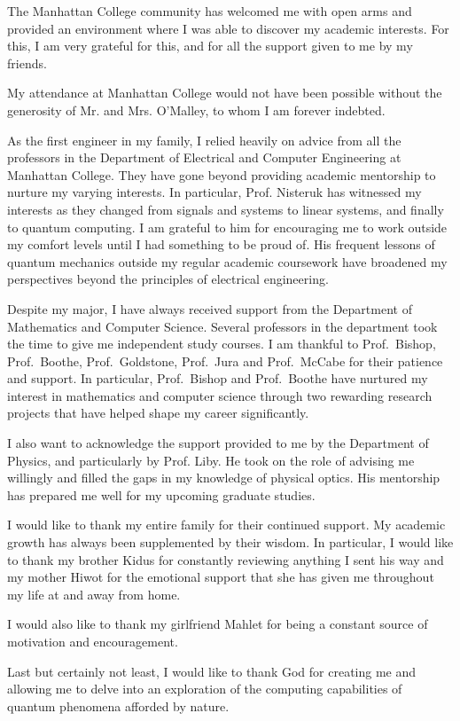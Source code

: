 The Manhattan College community has welcomed me with open arms and provided an environment where I was able to discover my academic interests. For this, I am very grateful for this, and for all the support given to me by my friends. 

My attendance at Manhattan College would not have been possible without the generosity of Mr. and Mrs. O'Malley, to whom I am forever indebted. 

As the first engineer in my family, I relied heavily on advice from all the professors in the Department of Electrical and Computer Engineering at Manhattan College. They have gone beyond providing academic mentorship to nurture my varying interests. In particular, Prof. Nisteruk has witnessed my interests as they changed from signals and systems to linear systems, and finally to quantum computing. I am grateful to him for encouraging me to work outside my comfort levels until I had something to be proud of. His frequent lessons of quantum mechanics outside my regular academic coursework have broadened my perspectives beyond the principles of electrical engineering.

Despite my major, I have always received support from the Department of Mathematics and Computer Science. Several professors in the department took the time to give me independent study courses. I am thankful to Prof.\ Bishop, Prof.\ Boothe, Prof.\ Goldstone, Prof.\ Jura and Prof.\ McCabe for their patience and support. In particular, Prof.\ Bishop and Prof.\ Boothe have nurtured my interest in mathematics and computer science through two rewarding research projects that have helped shape my career significantly.

I also want to acknowledge the support provided to me by the Department of Physics, and particularly by Prof. Liby. He took on the role of advising me willingly and filled the gaps in my knowledge of physical optics. His mentorship has prepared me well for my upcoming graduate studies.

I would like to thank my entire family for their continued support. My academic growth has always been supplemented by their wisdom. In particular, I would like to thank my brother Kidus for constantly reviewing anything I sent his way and my mother Hiwot for the emotional support that she has given me throughout my life at and away from home.

I would also like to thank my girlfriend Mahlet for being a constant source of motivation and encouragement.

Last but certainly not least, I would like to thank God for creating me and allowing me to delve into an exploration of the computing capabilities of quantum phenomena afforded by nature.
